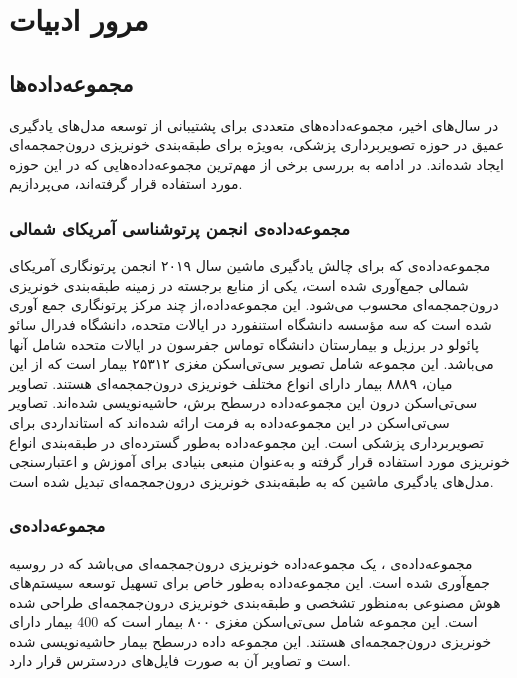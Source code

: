 \chapter{مرور ادبیات}

\section{مجموعه‌داده‌ها}


در سال‌های اخیر، مجموعه‌داده‌های متعددی برای پشتیبانی از توسعه مدل‌های یادگیری عمیق در حوزه تصویربرداری پزشکی، به‌ویژه برای طبقه‌بندی خونریزی درون‌جمجمه‌ای ایجاد شده‌اند. در ادامه به بررسی برخی از مهم‌ترین مجموعه‌داده‌هایی که در این حوزه مورد استفاده قرار گرفته‌اند، می‌پردازیم.

\subsection{مجموعه‌داده‌ی انجمن پرتوشناسی آمریکای شمالی
 }
مجموعه‌داده‌ی 
\cite{rsna_hemorrhage_detection_kaggle,rsna_kaggle}
 که برای چالش یادگیری ماشین سال ۲۰۱۹ انجمن پرتونگاری آمریکای شمالی جمع‌آوری شده است، یکی از منابع برجسته در زمینه طبقه‌بندی خونریزی درون‌جمجمه‌ای محسوب می‌شود. این مجموعه‌داده،از چند مرکز پرتونگاری جمع آوری شده است که سه مؤسسه دانشگاه استنفورد در ایالات متحده، دانشگاه فدرال سائو پائولو در برزیل و بیمارستان دانشگاه توماس جفرسون در ایالات متحده شامل آنها می‌باشد. این مجموعه شامل تصویر سی‌تی‌اسکن مغزی ۲۵۳۱۲ بیمار است که از این میان، ۸۸۸۹ بیمار دارای انواع مختلف خونریزی درون‌جمجمه‌ای هستند. تصاویر سی‌تی‌اسکن درون این مجموعه‌داده درسطح برش،‌ حاشیه‌نویسی 
شده‌اند.  تصاویر سی‌تی‌اسکن در این مجموعه‌داده به فرمت
  ارائه شده‌اند که استانداردی برای تصویربرداری پزشکی است. این مجموعه‌داده به‌طور گسترده‌ای در طبقه‌بندی انواع خونریزی مورد استفاده قرار گرفته و به‌عنوان منبعی بنیادی برای آموزش و اعتبارسنجی مدل‌های یادگیری ماشین که به طبقه‌بندی خونریزی درون‌جمجمه‌ای تبدیل شده است.

\subsection{مجموعه‌داده‌ی }
مجموعه‌داده‌ی
 \cite{medmos_khoruzhaya2024expanded}،
 یک مجموعه‌داده خونریزی درون‌جمجمه‌ای می‌باشد که در روسیه جمع‌آوری شده است. این مجموعه‌داده به‌طور خاص برای تسهیل توسعه سیستم‌های هوش مصنوعی به‌منظور تشخصی و طبقه‌بندی خونریزی درون‌جمجمه‌ای طراحی شده است. این مجموعه شامل سی‌تی‌اسکن مغزی ۸۰۰ بیمار است که 400 بیمار دارای خونریزی درون‌جمجمه‌ای هستند. این مجموعه داده درسطح بیمار حاشیه‌نویسی شده است و تصاویر آن به صورت فایل‌های 
 دردسترس قرار دارد.

